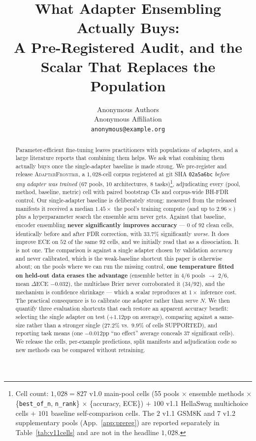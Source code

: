 \documentclass[11pt]{article}
\title{What Adapter Ensembling Actually Buys:\\A Pre-Registered Audit, and the Scalar That Replaces the Population}
\author{
  Anonymous Authors \\
  Anonymous Affiliation \\
  \texttt{anonymous@example.\allowbreak org}
}
\date{}
\begin{document}
\maketitle

\begin{abstract}
Parameter-efficient fine-tuning leaves practitioners with populations of adapters, and a large literature reports that combining them helps. We ask what combining them actually buys once the single-adapter baseline is made strong. We pre-register and release \textsc{AdapterFrontier}, a $1{,}028$-cell corpus registered at git SHA \texttt{02a5a6bc} \emph{before any adapter was trained} ($67$ pools, $10$ architectures, $8$ tasks)\footnote{Cell count: $1{,}028 = 827$ v1.0 main-pool cells (55 pools $\times$ ensemble methods $\times$ \{\texttt{best\_of\_n}, \texttt{n\_rank}\} $\times$ \{accuracy, ECE\}) $+$ $100$ v1.1 HellaSwag multichoice cells $+$ $101$ baseline self-comparison cells. The $2$ v1.1 GSM8K and $7$ v1.2 supplementary pools (App.~\ref{app:prereg}) are reported separately in Table~\ref{tab:v11cells} and are not in the headline $1{,}028$.}, adjudicating every (pool, method, baseline, metric) cell with paired bootstrap CIs and corpus-wide BH-FDR control. Our single-adapter baseline is deliberately strong: measured from the released manifests it received a median $1.45\times$ the pool's training compute (and up to $2.96\times$) plus a hyperparameter search the ensemble arm never gets. Against that baseline, encoder ensembling \textbf{never significantly improves accuracy} --- $0$ of $92$ clean cells, identically before and after FDR correction, with $33.7\%$ significantly \emph{worse}. It does improve ECE on $52$ of the same $92$ cells, and we initially read that as a dissociation. It is not one. The comparison is against a single adapter chosen by validation \emph{accuracy} and never calibrated, which is the weak-baseline shortcut this paper is otherwise about; on the pools where we can run the missing control, \textbf{one temperature fitted on held-out data erases the advantage} (ensemble better in $4/6$ pools $\to$ $2/6$, mean $\Delta$ECE $-0.032$), the multiclass Brier never corroborated it ($34/92$), and the mechanism is confidence shrinkage --- which a scalar reproduces at $1\times$ inference cost. The practical consequence is to calibrate one adapter rather than serve $N$. We then quantify three evaluation shortcuts that each restore an apparent accuracy benefit: selecting the single adapter on test ($+1.12$pp on average), comparing against a same-size rather than a stronger single ($27.2\%$ vs.\ $9.9\%$ of cells SUPPORTED), and reporting task means (one $-0.012$pp ``no effect'' average conceals $37$ significant cells). We release the cells, per-example predictions, split manifests and adjudication code so new methods can be compared without retraining.
\end{abstract}
\end{document}
